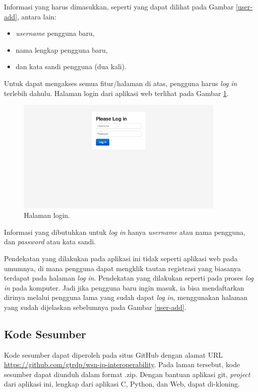 			Informasi yang harus dimasukkan, seperti yang dapat dilihat pada Gambar \ref{user-add}, antara lain:

				\begin{itemize}
					\item \emph{username} pengguna baru,
					\item nama lengkap pengguna baru,
					\item dan kata sandi pengguna (dua kali).
				\end{itemize}

			Untuk dapat mengakses semua fitur/halaman di atas, pengguna harus \emph{log in} terlebih dahulu. Halaman login dari aplikasi web terlihat pada Gambar \ref{login}.

				\begin{figure}[H]
				  \centering
				    \includegraphics[width=0.9\textwidth]{gambar/login}
				    \caption{Halaman login.}
				    \label{login}
				\end{figure}

			Informasi yang dibutuhkan untuk \emph{log in} hanya \emph{username} atau nama pengguna, dan \emph{password} atau kata sandi.

			Pendekatan yang dilakukan pada aplikasi ini tidak seperti aplikasi web pada umumnya, di mana pengguna dapat mengklik tautan registrasi yang biasanya terdapat pada halaman \emph{log in}. Pendekatan yang dilakukan seperti pada proses \emph{log in} pada komputer. Jadi jika pengguna baru ingin masuk, ia bisa mendaftarkan dirinya melalui pengguna lama yang sudah dapat \emph{log in}, menggunakan halaman yang sudah dijelaskan sebelumnya pada Gambar \ref{user-add}.


		\subsection{Kode Sesumber}
			Kode sesumber dapat diperoleh pada situs GitHub dengan alamat URL \url{https://github.com/gtrdp/wsn-ip-interoperability}. Pada laman tersebut, kode sesumber dapat diunduh dalam format .zip. Dengan bantuan aplikasi git, \emph{project} dari aplikasi ini, lengkap dari aplikasi C, Python, dan Web, dapat di-kloning.


